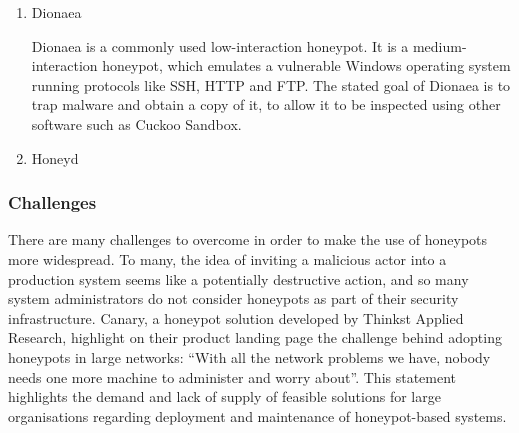 {\begin{enumerate}
\begin{itemize}
		\item It is an open-source project, allowing users to adapt the honeypot to suit their specific needs.
		
		\item Cowrie records interactions between the attacker and the honeypot, logging everything from commands executed and file downloads attempted to the source IP addresses and protocol information.
		
		\item Cowrie does not limit the number of simultaneous sessions, and can present a mock filesystem and shell to each attacker independently.
		
		\item The fact that the Cowrie software doesn't call on any external sofware to operate makes it much less vulnerable to third-party compromises. It also improves substantially on its predecessor, Kippo, in that many of the fingerprinting issues are resolved.
	\end{itemize}

	Cowrie cannot execute malware, but can be used in conjunction with other solutions such as Cuckoo Sandbox {https://github.com/cuckoosandbox/cuckoo , accessed 24th March 2018} in order to execute and analyse malware safely in a controlled environment.
	
	\item Dionaea
	
	Dionaea is a commonly used low-interaction honeypot. It is a medium-interaction honeypot, which emulates a vulnerable Windows operating system running protocols like SSH, HTTP and FTP. The stated goal of Dionaea is to trap malware and obtain a copy of it, to allow it to be inspected using other software such as Cuckoo Sandbox.
	
	
	\item Honeyd 
	
\end{enumerate}

\subsubsection{Challenges}
There are many challenges to overcome in order to make the use of honeypots more widespread. To many, the idea of inviting a malicious actor into a production system seems like a potentially destructive action, and so many system administrators do not consider honeypots as part of their security infrastructure. Canary, a honeypot solution developed by Thinkst Applied Research,  highlight on their product landing page the challenge behind adopting honeypots in large networks: “With all the network problems we have, nobody needs one more machine to administer and worry about”. This statement highlights the demand and lack of supply of feasible solutions for large organisations regarding deployment and maintenance of honeypot-based systems. 
 

}
